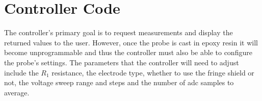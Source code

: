 \section{Controller Code}

The controller's primary goal is to request measurements and display the returned values to the user.
However, once the probe is cast in epoxy resin it will become unprogrammable and thus the controller must also be able to configure the probe's settings.
The parameters that the controller will need to adjust include the $R_1$ resistance, the electrode type, whether to use the fringe shield or not, the voltage sweep range and steps and the number of \gls{adc} samples to average.